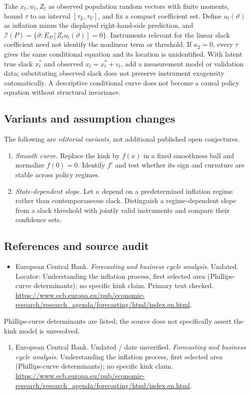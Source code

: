 \documentclass[11pt,a4paper]{article}
\begin{document}
Take \(x_t,w_t,Z_t\) as observed population random vectors with finite moments, bound \(\tau\) to an interval \([\tau_L,\tau_U]\), and fix a compact coefficient set. Define \(u_t(\vartheta)\) as inflation minus the displayed right-hand-side prediction, and \(\mathcal I(P)=\{\vartheta:E_P[Z_tu_t(\vartheta)]=0\}\). Instruments relevant for the linear slack coefficient need not identify the nonlinear term or threshold. If \(\kappa_2=0\), every \(\tau\) gives the same conditional equation and its location is unidentified. With latent true slack \(x_t^*\) and observed \(x_t=x_t^*+v_t\), add a measurement model or validation data; substituting observed slack does not preserve instrument exogeneity automatically. A descriptive conditional curve does not become a causal policy equation without structural invariance.
\subsection*{Variants and assumption changes}
The following are \emph{editorial variants}, not additional published open conjectures.
\begin{enumerate}
\item \emph{Smooth curve.} Replace the kink by \(f(x)\) in a fixed smoothness ball and normalize \(f(0)=0\). Identify \(f'\) and test whether its sign and curvature are stable across policy regimes.
\item \emph{State-dependent slope.} Let \(\kappa\) depend on a predetermined inflation regime rather than contemporaneous slack. Distinguish a regime-dependent slope from a slack threshold with jointly valid instruments and compare their confidence sets.
\end{enumerate}
\subsection*{References and source audit}
\begin{itemize}
\item European Central Bank. \emph{Forecasting and business cycle analysis}. Undated. Locator: Understanding the inflation process, first selected area (Phillips-curve determinants); no specific kink claim. Primary text checked. \url{https://www.ecb.europa.eu/pub/economic-research/research_agenda/forecasting/html/index.en.html}.
\end{itemize}
Phillips-curve determinants are listed; the source does not specifically assert the kink model is unresolved.
\begin{enumerate}\raggedright
\item\hypertarget{definitions:source:30007523:1}{} European Central Bank. Undated / date unverified. \emph{Forecasting and business cycle analysis}. Understanding the inflation process, first selected area (Phillips-curve determinants); no specific kink claim.
\url{https://www.ecb.europa.eu/pub/economic-research/research_agenda/forecasting/html/index.en.html}.
\end{enumerate}
\end{document}
